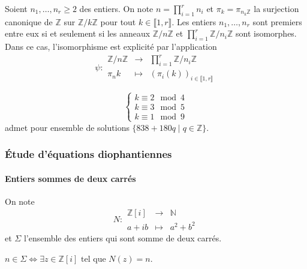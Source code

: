 	\begin{theorem}[Chinois]
		Soient $n_1, \dots, n_r \geq 2$ des entiers. On note $n = \prod_{i=1}^r n_i$ et $\pi_k = \pi_{{n_k}\mathbb{Z}}$ la surjection canonique de $\mathbb{Z}$ sur $\mathbb{Z}/k\mathbb{Z}$ pour tout $k \in \llbracket 1, r \rrbracket$.
		\newpar
		Les entiers $n_1, \dots, n_r$ sont premiers entre eux si et seulement si les anneaux $\mathbb{Z}/n\mathbb{Z}$ et $\prod_{i=1}^{r}\mathbb{Z}/n_i\mathbb{Z}$ sont isomorphes. Dans ce cas, l'isomorphisme est explicité par l'application
		\[
			\psi :
			\begin{array}{ccc}
				\mathbb{Z}/n\mathbb{Z} &\rightarrow& \prod_{i=1}^{r}\mathbb{Z}/n_i\mathbb{Z} \\
				\pi_{n}{k} &\mapsto& (\pi_i(k))_{i \in \llbracket 1, r \rrbracket}
			\end{array}
		\]
	\end{theorem}


	\begin{example}
		\[
			\begin{cases}
				k \equiv 2 \mod 4 \\
				k \equiv 3 \mod 5 \\
				k \equiv 1 \mod 9
			\end{cases}
		\]
		admet pour ensemble de solutions $\{ 838+180q \mid q \in \mathbb{Z} \}$.
	\end{example}

	\subsubsection{Étude d'équations diophantiennes}

	\paragraph{Entiers sommes de deux carrés}


	\begin{notation}
		On note \[ N :
		\begin{array}{ccc}
			\mathbb{Z}[i] &\rightarrow& \mathbb{N} \\
			a+ib &\mapsto& a^2 + b^2
		\end{array}
		\] et $\Sigma$ l'ensemble des entiers qui sont somme de deux carrés.
	\end{notation}

	\begin{remark}
		$n \in \Sigma \iff \exists z \in \mathbb{Z}[i] \text{ tel que } N(z)=n$.
	\end{remark}

